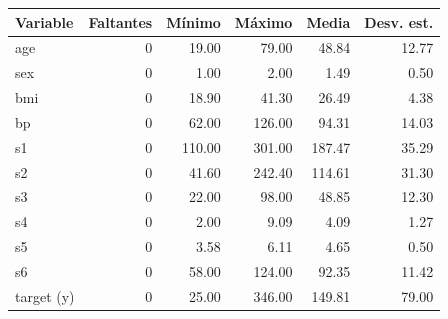 \begin{tabular}{lrrrrr}
\toprule
Variable & Faltantes & Mínimo & Máximo & Media & Desv. est. \\
\midrule
age & 0 & 19.00 & 79.00 & 48.84 & 12.77 \\
sex & 0 & 1.00 & 2.00 & 1.49 & 0.50 \\
bmi & 0 & 18.90 & 41.30 & 26.49 & 4.38 \\
bp & 0 & 62.00 & 126.00 & 94.31 & 14.03 \\
s1 & 0 & 110.00 & 301.00 & 187.47 & 35.29 \\
s2 & 0 & 41.60 & 242.40 & 114.61 & 31.30 \\
s3 & 0 & 22.00 & 98.00 & 48.85 & 12.30 \\
s4 & 0 & 2.00 & 9.09 & 4.09 & 1.27 \\
s5 & 0 & 3.58 & 6.11 & 4.65 & 0.50 \\
s6 & 0 & 58.00 & 124.00 & 92.35 & 11.42 \\
target (y) & 0 & 25.00 & 346.00 & 149.81 & 79.00 \\
\bottomrule
\end{tabular}
